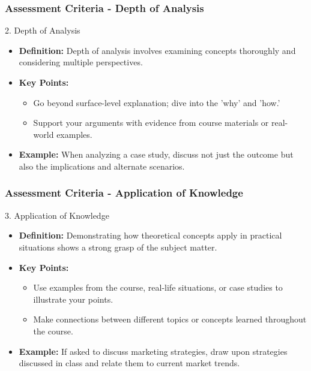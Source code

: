 \documentclass[aspectratio=169]{beamer}
\begin{document}
\begin{frame}[fragile]
    \frametitle{Assessment Criteria - Depth of Analysis}
    \begin{block}{2. Depth of Analysis}
        \begin{itemize}
            \item \textbf{Definition:} Depth of analysis involves examining concepts thoroughly and considering multiple perspectives.
            \item \textbf{Key Points:}
                \begin{itemize}
                    \item Go beyond surface-level explanation; dive into the 'why' and 'how.'
                    \item Support your arguments with evidence from course materials or real-world examples.
                \end{itemize}
            \item \textbf{Example:} When analyzing a case study, discuss not just the outcome but also the implications and alternate scenarios.
        \end{itemize}
    \end{block}
\end{frame}

\begin{frame}[fragile]
    \frametitle{Assessment Criteria - Application of Knowledge}
    \begin{block}{3. Application of Knowledge}
        \begin{itemize}
            \item \textbf{Definition:} Demonstrating how theoretical concepts apply in practical situations shows a strong grasp of the subject matter.
            \item \textbf{Key Points:}
                \begin{itemize}
                    \item Use examples from the course, real-life situations, or case studies to illustrate your points.
                    \item Make connections between different topics or concepts learned throughout the course.
                \end{itemize}
            \item \textbf{Example:} If asked to discuss marketing strategies, draw upon strategies discussed in class and relate them to current market trends.
        \end{itemize}
    \end{block}
\end{frame}
\end{document}
